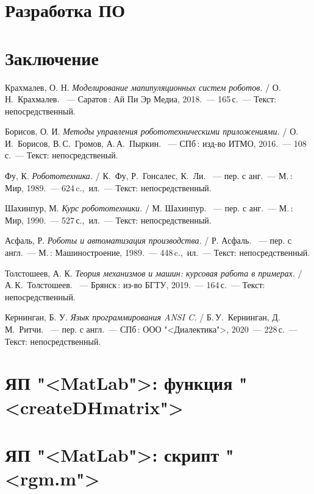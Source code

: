 \documentclass[oneside, final, 14pt]{extarticle}
\begin{document}
\newpage

\section{Разработка ПО}


\newpage

\section*{Заключение}


\newpage

\begin{thebibliography}{00}

   Крахмалев, О. Н.
  \emph{Моделирование мапипуляционных систем роботов.}
  / О.\,Н.~Крахмалев.
  ~--- Саратов\,: Ай Пи Эр Медиа, 2018.~--- 165\,с.~--- Текст: непосредственный.

   Борисов, О. И.
  \emph{Методы управления робототехническими приложениями.}
  / О.\,И.~Борисов, В.\,С.~Громов, А.\,А.~Пыркин.
  ~--- СПб\,: изд-во ИТМО, 2016.~--- 108\,с.~--- Текст: непосредственый.

   Фу, К.
  \emph{Робототехника.}
  / К.~Фу, Р.~Гонсалес, К.~Ли.
  ~--- пер. с анг.~--- М.\,: Мир, 1989.~--- 624\,c.,~ил.~--- Текст: непосредственный.
  
   Шахинпур, М.
  \emph{Курс робототехники.}
  / М. Шахинпур.
  ~--- пер. с анг.~--- М.\,: Мир, 1990.~--- 527\,с.,~ил.~--- Текст: непосредственный.

   Асфаль, Р.
  \emph{Роботы и автоматизация производства.}
  / Р. Асфаль.
  ~--- пер. с англ.~--- М.\,: Машиностроение, 1989.~--- 448\,c.,~ил.~--- Текст: непосредственный.

   Толстошеев, А. К.
  \emph{Теория механизмов и машин: курсовая работа в примерах.}
  / А.\,К.~Толстошеев. 
  ~--- Брянск\,: из-во БГТУ, 2019.~--- 164\,с.~--- Текст: непосредственный.

   Кернинган, Б. У.
  \emph{Язык программирования ANSI C.}
  / Б.\,У.~Кернинган, Д.\,М.~Ритчи.
  ~--- пер. с англ.~--- СПб\,: ООО "<Диалектика">, 2020~--- 228\,с.~--- Текст: непосредственный.

\end{thebibliography}
\newpage

\appendix

\section{ЯП "<MatLab">: функция "<createDHmatrix">}
{\small
{}
}
\newpage

\section{ЯП "<MatLab">: скрипт "<rgm.m">}
{\small
{}
}

\end{document}
